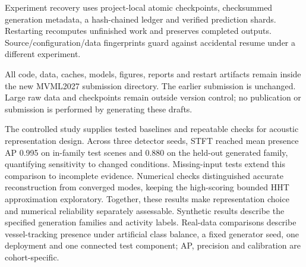 \documentclass[11pt,letterpaper]{article}
\begin{document}
Experiment recovery uses project-local atomic checkpoints, checksummed generation metadata, a hash-chained ledger and verified prediction shards. Restarting recomputes unfinished work and preserves completed outputs. Source/configuration/data fingerprints guard against accidental resume under a different experiment.\par

All code, data, caches, models, figures, reports and restart artifacts remain inside the new MVML2027 submission directory. The earlier submission is unchanged. Large raw data and checkpoints remain outside version control; no publication or submission is performed by generating these drafts.\par

The controlled study supplies tested baselines and repeatable checks for acoustic representation design. Across three detector seeds, STFT reached mean presence AP 0.995 on in-family test scenes and 0.880 on the held-out generated family, quantifying sensitivity to changed conditions. Missing-input tests extend this comparison to incomplete evidence. Numerical checks distinguished accurate reconstruction from converged modes, keeping the high-scoring bounded HHT approximation exploratory. Together, these results make representation choice and numerical reliability separately assessable. Synthetic results describe the specified generation families and activity labels. Real-data comparisons describe vessel-tracking presence under artificial class balance, a fixed generator seed, one deployment and one connected test component; AP, precision and calibration are cohort-specific.\par

{\fontsize{9}{11}\selectfont





}
\end{document}
